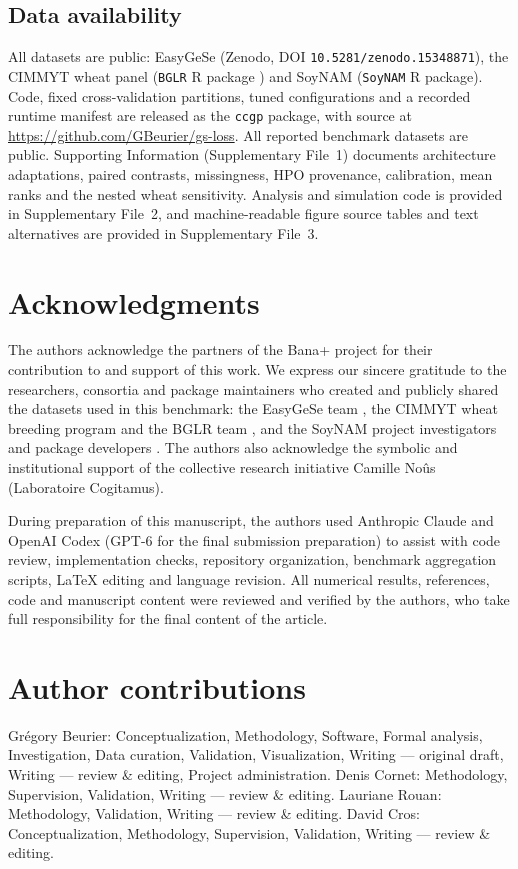 \documentclass[9pt,twocolumn,twoside,lineno]{gsag3jnl}
\theoremstyle{plain}
\theoremstyle{remark}
\begin{document}
\subsection{Data availability}
All datasets are public: EasyGeSe (Zenodo, DOI \texttt{10.5281/zenodo.15348871}), the CIMMYT wheat panel
(\texttt{BGLR} R package \citep{perez2014bglr}) and SoyNAM (\texttt{SoyNAM} R package). Code, fixed
cross-validation partitions, tuned configurations and a recorded runtime manifest are
released as the \texttt{ccgp} package, with source at
\url{https://github.com/GBeurier/gs-loss}. All reported benchmark datasets are
public. Supporting Information (Supplementary File~1) documents architecture
adaptations, paired contrasts, missingness, HPO provenance, calibration, mean
ranks and the nested wheat sensitivity. Analysis and simulation code is provided
in Supplementary File~2, and machine-readable figure source tables and text
alternatives are provided in Supplementary File~3.





\section{Acknowledgments}
The authors acknowledge the partners of the Bana+ project for their contribution
to and support of this work. We express our sincere gratitude to the researchers,
consortia and package maintainers who created and publicly shared the datasets
used in this benchmark: the EasyGeSe team \citep{quesada2025easygese}, the
CIMMYT wheat breeding program and the BGLR team \citep{crossa2010,perez2014bglr},
and the SoyNAM project investigators and package developers
\citep{xavier2016soynam}. The authors also acknowledge the symbolic and
institutional support of the collective research initiative Camille No\^us
(Laboratoire Cogitamus).

During preparation of this manuscript, the authors used Anthropic Claude and OpenAI Codex (GPT-6 for the final submission preparation) to assist with code review, implementation checks, repository organization, benchmark aggregation scripts, LaTeX editing and language revision. All numerical results, references, code and manuscript content were reviewed and verified by the authors, who take full responsibility for the final content of the article.


\section{Author contributions}
Grégory Beurier: Conceptualization, Methodology, Software, Formal analysis, Investigation, Data curation, Validation, Visualization, Writing --- original draft, Writing --- review \& editing, Project administration.
Denis Cornet: Methodology, Supervision, Validation, Writing --- review \& editing.
Lauriane Rouan: Methodology, Validation, Writing --- review \& editing.
David Cros: Conceptualization, Methodology, Supervision, Validation, Writing --- review \& editing.
\end{document}
